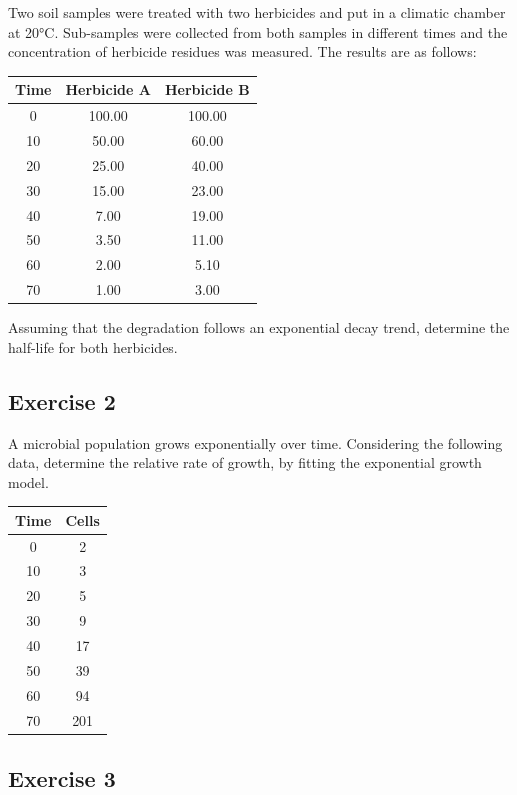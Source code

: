 \documentclass[a4paper,12pt,oneside]{book}
\begin{document}
Two soil samples were treated with two herbicides and put in a climatic chamber at 20°C. Sub-samples were collected from both samples in different times and the concentration of herbicide residues was measured. The results are as follows:

\begin{longtable}[]{@{}ccc@{}}
\toprule
Time & Herbicide A & Herbicide B \\
\midrule
\endhead
0 & 100.00 & 100.00 \\
10 & 50.00 & 60.00 \\
20 & 25.00 & 40.00 \\
30 & 15.00 & 23.00 \\
40 & 7.00 & 19.00 \\
50 & 3.50 & 11.00 \\
60 & 2.00 & 5.10 \\
70 & 1.00 & 3.00 \\
\bottomrule
\end{longtable}

Assuming that the degradation follows an exponential decay trend, determine the half-life for both herbicides.

\hypertarget{exercise-2-8}{%
\subsection{Exercise 2}\label{exercise-2-8}}

A microbial population grows exponentially over time. Considering the following data, determine the relative rate of growth, by fitting the exponential growth model.

\begin{longtable}[]{@{}cc@{}}
\toprule
Time & Cells \\
\midrule
\endhead
0 & 2 \\
10 & 3 \\
20 & 5 \\
30 & 9 \\
40 & 17 \\
50 & 39 \\
60 & 94 \\
70 & 201 \\
\bottomrule
\end{longtable}

\hypertarget{exercise-3-6}{%
\subsection{Exercise 3}\label{exercise-3-6}}
\end{document}

